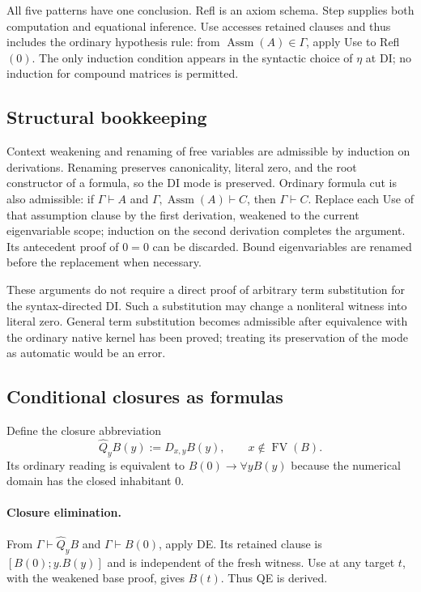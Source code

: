 \documentclass[11pt,letterpaper]{article}
\theoremstyle{definition}
\begin{document}
All five patterns have one conclusion. Refl is an axiom schema.
Step supplies both computation and equational inference. Use accesses
retained clauses and thus includes the ordinary hypothesis rule:
from $\operatorname{Assm}(A)\in\Gamma$, apply Use to Refl$(0)$.
The only induction condition appears in the syntactic choice of
$\eta$ at DI; no induction for compound matrices is permitted.

\subsection{Structural bookkeeping}

Context weakening and renaming of free variables are admissible by
induction on derivations. Renaming preserves canonicality, literal zero,
and the root constructor of a formula, so the DI mode is preserved.
Ordinary formula cut is also admissible: if
$\Gamma\vdash A$ and $\Gamma,\operatorname{Assm}(A)\vdash C$, then
$\Gamma\vdash C$. Replace each Use of that assumption clause by the
first derivation, weakened to the current eigenvariable scope; induction
on the second derivation completes the argument. Its antecedent proof
of $0=0$ can be discarded. Bound eigenvariables are renamed before the
replacement when necessary.

These arguments do not require a direct proof of arbitrary term
substitution for the syntax-directed DI. Such a substitution may change
a nonliteral witness into literal zero. General term substitution becomes
admissible after equivalence with the ordinary native kernel has been
proved; treating its preservation of the mode as automatic would be an
error.

\subsection{Conditional closures as formulas}

Define the closure abbreviation
\[
 \widehat Q_y B(y):=D_{x,y}B(y),\qquad x\notin\operatorname{FV}(B).
\]
Its ordinary reading is equivalent to $B(0)\to\forall yB(y)$ because
the numerical domain has the closed inhabitant $0$.

\paragraph{Closure elimination.}
From $\Gamma\vdash\widehat Q_yB$ and $\Gamma\vdash B(0)$, apply DE.
Its retained clause is $[B(0);y.B(y)]$ and is independent of the fresh
witness. Use at any target $t$, with the weakened base proof, gives
$B(t)$. Thus QE is derived.
\end{document}
